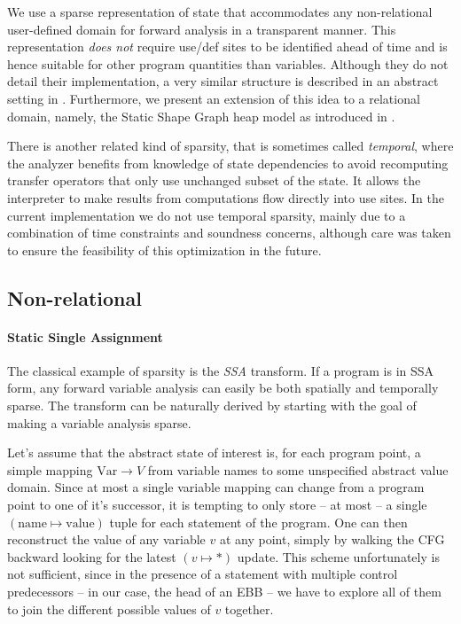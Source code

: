 \documentclass[11pt]{article}
\begin{document}
We use a sparse representation of state that accommodates any non-relational user-defined domain for forward analysis in a transparent manner.
This representation \emph{does not} require use/def sites to be identified ahead of time and is hence suitable for other program quantities than variables.
Although they do not detail their implementation, a very similar structure is described in an abstract setting in \cite{sparse-nr}.
Furthermore, we present an extension of this idea to a relational domain, namely, the Static Shape Graph heap model as introduced in \cite{ssc}.

There is another related kind of sparsity, that is sometimes called \emph{temporal}, where the analyzer benefits from knowledge of state dependencies to avoid recomputing transfer operators that only use unchanged subset of the state. It allows the interpreter to make results from computations flow directly into use sites. In the current implementation we do not use temporal sparsity, mainly due to a combination of time constraints and soundness concerns, although care was taken to ensure the feasibility of this optimization in the future.

\subsection*{Non-relational}

\paragraph{Static Single Assignment} The classical example of sparsity is the \emph{SSA} transform. If a program is in SSA form, any forward variable analysis can easily be both spatially and temporally sparse. The transform can be naturally derived by starting with the goal of making a variable analysis sparse.

Let's assume that the abstract state of interest is, for each program point, a simple mapping $\text{Var}\to V$ from variable names to some unspecified abstract value domain. Since at most a single variable mapping can change from a program point to one of it's successor, it is tempting to only store -- at most -- a single $(\text{name}\mapsto\text{value})$ tuple for each statement of the program. One can then reconstruct the value of any variable $v$ at any point, simply by walking the CFG backward looking for the latest $(v\mapsto *)$ update. This scheme unfortunately is not sufficient, since in the presence of a statement with multiple control predecessors -- in our case, the head of an EBB -- we have to explore all of them to join the different possible values of $v$ together.
\end{document}
